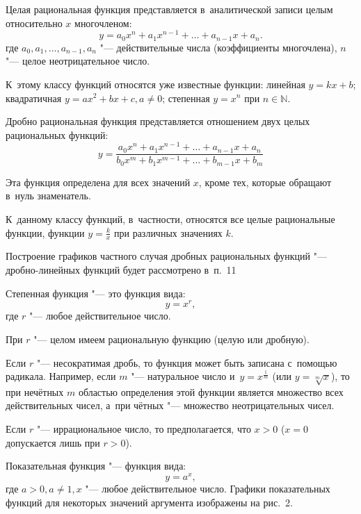 Целая рациональная функция представляется в~аналитической записи целым
относительно $x$ многочленом:
\begin{equation*}
y = a_{0}x^{n} + a_{1}x^{n-1} + \ldots + a_{n-1}x + a_{n} .
\end{equation*}
где $a_{0}, a_{1}, \dots, a_{n-1}, a_{n}$ "--- действительные числа
(коэффициенты многочлена), $n$ "--- целое неотрицательное число.

К~этому классу функций относятся уже известные функции:
линейная $y = kx + b$;
квадратичная $y = ax^{2} + bx + c, a \ne 0$;
степенная $y = x^{n}$ при $n \in \mathbb{N}$.

Дробно рациональная функция представляется отношением двух целых рациональных
функций:
\begin{equation*}
y = 
\frac
{a_{0}x^{n} + a_{1}x^{n-1} + \ldots + a_{n-1}x + a_{n}}
{b_{0}x^{m} + b_{1}x^{m-1} + \ldots + b_{m-1}x + b_{m}}
\end{equation*}

Эта функция определена для всех значений $x$, кроме тех,
которые обращают в~нуль знаменатель.

К~данному классу функций, в~частности, относятся все целые рациональные функции,
функции $\displaystyle y = \frac{k}{x}$ при различных значениях $k$.

Построение графиков частного случая дробных рациональных функций "---
дробно-линейных функций будет рассмотрено в~п.\ 11

Степенная функция "--- это функция вида:
\begin{equation*}
y = x^{r},
\end{equation*}
где $r$ "--- любое действительное число.

При $r$ "--- целом имеем рациональную функцию (целую или дробную).

Если $r$ "--- несократимая дробь, то функция может быть записана с~помощью радикала.
Например, если $m$ "--- натуральное число и~$\displaystyle y = x^{\frac{1}{m}}$
(или $y = \sqrt[m]{x}$), то при нечётных $m$ областью определения этой функции
является множество всех действительных чисел, а~при чётных "--- множество
неотрицательных чисел.

Если $r$ "--- иррациональное число, то предполагается, что $x>0$
($x=0$ допускается лишь при $r>0$).

Показательная функция "--- функция вида:
\begin{equation*}
y = a^{x},
\end{equation*}
где $a>0, a \ne 1, x$ "--- любое действительное число.
Графики показательных функций для некоторых значений аргумента изображены
на рис.\ 2.

